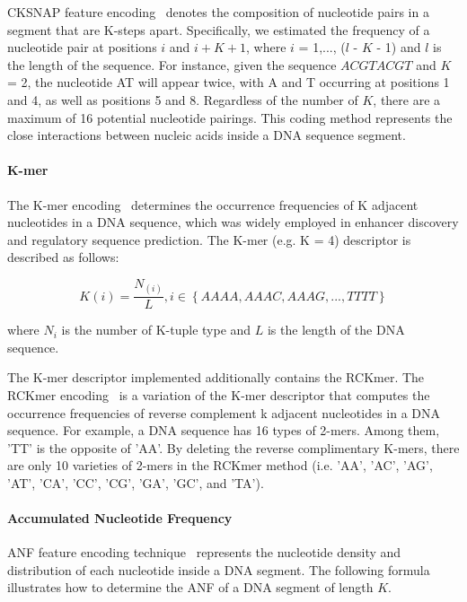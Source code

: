 \gls{CKSNAP} feature encoding~\cite{Zhang2013PredictionPairs,Liu2017BioSeq-Analysis:Approaches} denotes the composition of nucleotide pairs in a segment that are K-steps apart. Specifically, we estimated the frequency of a nucleotide pair at positions $i$ and $i + K + 1$, where $i$ = 1,..., ($l$ - $K$ - 1) and $l$ is the length of the sequence. For instance, given the sequence $ACGTACGT$ and $K$ = 2, the nucleotide AT will appear twice, with A and T occurring at positions 1 and 4, as well as positions 5 and 8.
Regardless of the number of $K$, there are a maximum of 16 potential nucleotide pairings. This coding method represents the close interactions between nucleic acids inside a \gls{DNA} sequence segment.

\paragraph{K-mer}

The K-mer encoding~\cite{Manavalan20194mCpred-EL:Genome,Huang2018BERMP:Approach} determines the occurrence frequencies of K adjacent nucleotides in a \gls{DNA} sequence, which was widely employed in enhancer discovery and regulatory sequence prediction. The K-mer (e.g. K = 4) descriptor is described as follows:

\begin{equation}\label{eq:K-mer}
    K(i) = \frac{N_{(i)}}{L}, i \in \left\{AAAA, AAAC, AAAG,...,TTTT\right\}
\end{equation}

\noindent where $N_{i}$ is the number of K-tuple type and $L$ is the length of the \gls{DNA} sequence.

The K-mer descriptor implemented additionally contains the \gls{RCKmer}. The \gls{RCKmer} encoding~\cite{Chen2019ILearn:Data} is a variation of the K-mer descriptor that computes the occurrence frequencies of reverse complement k adjacent nucleotides in a \gls{DNA} sequence. For example, a \gls{DNA} sequence has 16 types of 2-mers. Among them, 'TT' is the opposite of 'AA'. By deleting the reverse complimentary K-mers, there are only 10 varieties of 2-mers in the \gls{RCKmer} method (i.e. 'AA', 'AC', 'AG', 'AT', 'CA', 'CC', 'CG', 'GA', 'GC', and 'TA').

\paragraph{Accumulated Nucleotide Frequency}

\gls{ANF} feature encoding technique~\cite{Feng2019IDNA6mA-PseKNC:PseKNC} represents the nucleotide density and distribution of each nucleotide inside a \gls{DNA} segment. The following formula illustrates how to determine the \gls{ANF} of a \gls{DNA} segment of length $K$.


